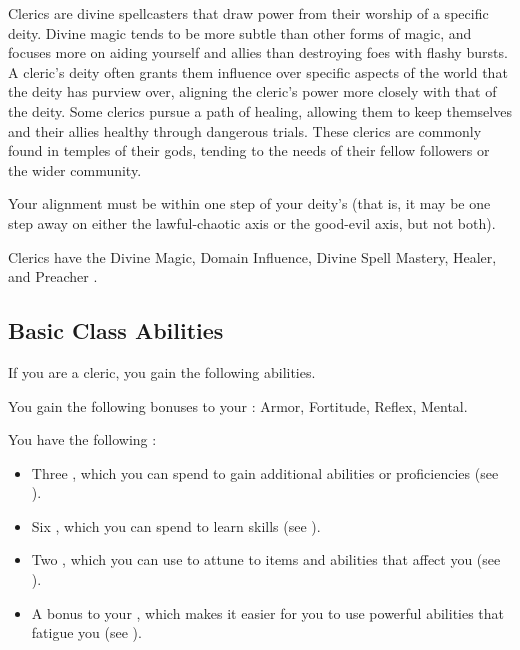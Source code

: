     Clerics are divine spellcasters that draw power from their worship of a specific deity.
    Divine magic tends to be more subtle than other forms of magic, and focuses more on aiding yourself and allies than destroying foes with flashy bursts.
    A cleric's deity often grants them influence over specific aspects of the world that the deity has purview over, aligning the cleric's power more closely with that of the deity.
    Some clerics pursue a path of healing, allowing them to keep themselves and their allies healthy through dangerous trials.
    These clerics are commonly found in temples of their gods, tending to the needs of their fellow followers or the wider community.

     Your alignment must be within one step of your deity's (that is, it may be one step away on either the lawful-chaotic axis or the good-evil axis, but not both).

     Clerics have the Divine Magic, Domain Influence, Divine Spell Mastery, Healer, and Preacher .

    \subsection{Basic Class Abilities}
        If you are a cleric, you gain the following abilities.

        You gain the following bonuses to your :  Armor,  Fortitude,  Reflex,  Mental.

         You have the following :
        \begin{itemize}
            \item Three , which you can spend to gain additional abilities or proficiencies (see ).
            \item Six , which you can spend to learn skills (see ).
            \item Two , which you can use to attune to items and abilities that affect you (see ).
            \item A  bonus to your , which makes it easier for you to use powerful abilities that fatigue you (see ).
        \end{itemize}


